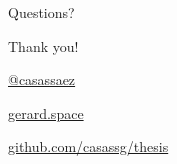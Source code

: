 \documentclass{beamer}
\newcommand{\hugeframedouble}[2]{
\begin{frame}[c]
  \begin{center}
    \huge\textcolor{title}{#1}
    \vfill

    \normalsize #2

  \end{center}

\end{frame}
}
\newcommand{\hugeframe}[1]{
\begin{frame}[c]
  \begin{center}
    \huge\textcolor{title}{#1}
  \end{center}

\end{frame}
}
\begin{document}
\hugeframe{Questions?}


\hugeframedouble{Thank you!}{
\begin{description}
  \addtolength{\itemsep}{5pt}
  \item[\textbf{Twitter}]  \href{http://twitter.com/casassaez}{@casassaez}
  \item[\textbf{Website}]  \href{http://gerard.space}{gerard.space}
  \item[\textbf{Repo}] \href{http://github.com/casassg/thesis}{github.com/casassg/thesis}

\end{description} 

}



\end{document}
